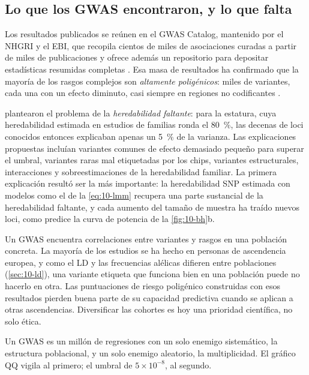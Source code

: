 \subsection{Lo que los GWAS encontraron, y lo que falta}

Los resultados publicados se reúnen en el GWAS Catalog, mantenido por el NHGRI y el EBI, que recopila cientos de miles de asociaciones curadas a partir de miles de publicaciones y ofrece además un repositorio para depositar estadísticas resumidas completas \parencite{c10-sollis2023}. Esa masa de resultados ha confirmado que la mayoría de los rasgos complejos son \emph{altamente poligénicos}: miles de variantes, cada una con un efecto diminuto, casi siempre en regiones no codificantes \parencite{c10-visscher2017}.

\textcite{c10-manolio2009} plantearon el problema de la \emph{heredabilidad faltante}: para la estatura, cuya heredabilidad estimada en estudios de familias ronda el \SI{80}{\percent}, las decenas de loci conocidos entonces explicaban apenas un \SI{5}{\percent} de la varianza. Las explicaciones propuestas incluían variantes comunes de efecto demasiado pequeño para superar el umbral, variantes raras mal etiquetadas por los chips, variantes estructurales, interacciones y sobreestimaciones de la heredabilidad familiar. La primera explicación resultó ser la más importante: la heredabilidad SNP estimada con modelos como el de la \cref{eq:10-lmm} recupera una parte sustancial de la heredabilidad faltante, y cada aumento del tamaño de muestra ha traído nuevos loci, como predice la curva de potencia de la \cref{fig:10-bh}b.

\begin{cuidado}
Un GWAS encuentra correlaciones entre variantes y rasgos en una población concreta. La mayoría de los estudios se ha hecho en personas de ascendencia europea, y como el LD y las frecuencias alélicas difieren entre poblaciones (\cref{sec:10-ld}), una variante etiqueta que funciona bien en una población puede no hacerlo en otra. Las puntuaciones de riesgo poligénico construidas con esos resultados pierden buena parte de su capacidad predictiva cuando se aplican a otras ascendencias. Diversificar las cohortes es hoy una prioridad científica, no solo ética.
\end{cuidado}

\begin{ideaclave}
Un GWAS es un millón de regresiones con un solo enemigo sistemático, la estructura poblacional, y un solo enemigo aleatorio, la multiplicidad. El gráfico QQ vigila al primero; el umbral de $5\times10^{-8}$, al segundo.
\end{ideaclave}

